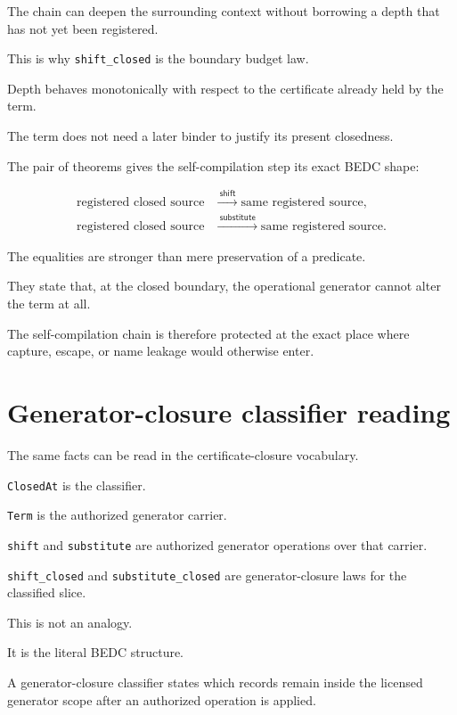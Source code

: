 The chain can deepen the surrounding context without borrowing a depth that has
not yet been registered.

This is why \texttt{shift\_closed} is the boundary budget law.

Depth behaves monotonically with respect to the certificate already held by the
term.

The term does not need a later binder to justify its present closedness.

The pair of theorems gives the self-compilation step its exact BEDC shape:

$$
\begin{aligned}
  \text{registered closed source}
  &\xrightarrow{\ \mathsf{shift}\ }
  \text{same registered source},\\
  \text{registered closed source}
  &\xrightarrow{\ \mathsf{substitute}\ }
  \text{same registered source}.
\end{aligned}
$$

The equalities are stronger than mere preservation of a predicate.

They state that, at the closed boundary, the operational generator cannot alter
the term at all.

The self-compilation chain is therefore protected at the exact place where
capture, escape, or name leakage would otherwise enter.

\section{Generator-closure classifier reading}
\label{sec:closed-term-substitution-generator-closure-classifier}

The same facts can be read in the certificate-closure vocabulary.

\texttt{ClosedAt} is the classifier.

\texttt{Term} is the authorized generator carrier.

\texttt{shift} and \texttt{substitute} are authorized generator operations over
that carrier.

\texttt{shift\_closed} and \texttt{substitute\_closed} are generator-closure
laws for the classified slice.

This is not an analogy.

It is the literal BEDC structure.

A generator-closure classifier states which records remain inside the licensed
generator scope after an authorized operation is applied.


